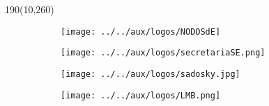 \documentclass[a4paper,12pt]{article}
\begin{document}
\begin{textblock}{190}(10,260) \centering
\begin{figure}[H]
    \centering
    \hspace{0.5cm}\begin{subfigure}[c]{0.2\textwidth}
    \centering
    \texttt{[image: ../../aux/logos/NODOSdE]}
    \end{subfigure}
    \hspace{0.1cm}
    \begin{subfigure}[c]{0.17\textwidth}
    \centering
    \texttt{[image: ../../aux/logos/secretariaSE.png]}
    \end{subfigure}
    \hspace{0.1cm}
    \begin{subfigure}[c]{0.24\textwidth}
    \centering
    \texttt{[image: ../../aux/logos/sadosky.jpg]}
    \end{subfigure}
    \hspace{0.1cm}
    \begin{subfigure}[c]{0.22\textwidth}
    \centering \phantom{.} \vspace{0.6cm}

    \texttt{[image: ../../aux/logos/LMB.png]}
    \end{subfigure}
\end{figure}
\end{textblock}

\newpage






\centering

\scalebox{2.5}{\Large Cronograma}
\end{document}
